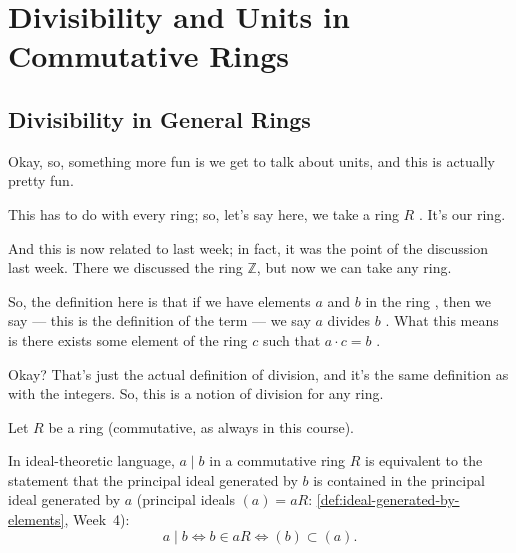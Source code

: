 \section{Divisibility and Units in Commutative Rings}

\subsection{Divisibility in General Rings}

\begin{speech}[00:23:18 - 00:24:29]
Okay, so, something more fun is we get to talk about units, and this is actually pretty fun.

This has to do with every ring; so, let's say here, we take a ring $R$ . It's our ring.

And this is now related to last week; in fact, it was the point of the discussion last week. There we discussed the ring $\mathbb{Z}$, but now we can take any ring.

So, the definition here is that if we have elements $a$ and $b$ in the ring , then we say --- this is the definition of the term --- we say $a$ divides $b$ . What this means is there exists some element of the ring $c$  such that $a \cdot c = b$ .

Okay? That's just the actual definition of division, and it's the same definition as with the integers. So, this is a notion of division for any ring.
\end{speech}

\begin{content}
Let $R$ be a ring (commutative, as always in this course).


\begin{steps}
In ideal-theoretic language, $a \mid b$ in a commutative ring $R$ is equivalent to the statement that the principal ideal generated by $b$ is contained in the principal ideal generated by $a$ (principal ideals $(a) = aR$: \cref{def:ideal-generated-by-elements}, Week~4):
\[
a \mid b \iff b \in aR \iff (b) \subset (a).
\]
\end{steps}
\end{content}

